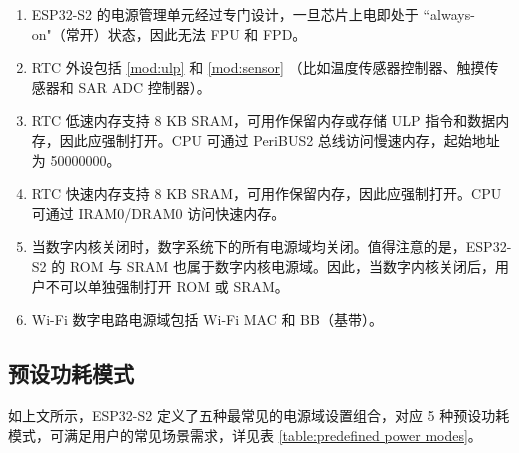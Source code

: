 \documentclass[main\_\_CN.tex]{subfiles}
\begin{document}
\begin{tiplisting}
\vspace{-2em}\label{RTC_STATUS}
\begin{enumerate}
\item ESP32-S2 的电源管理单元经过专门设计，一旦芯片上电即处于 ``always-on"（常开）状态，因此无法 FPU 和 FPD。
\item RTC 外设包括 \ref{mod:ulp} \textit{} 和 \ref{mod:sensor} \textit{}（比如温度传感器控制器、触摸传感器和 SAR ADC 控制器）。
\item RTC 低速内存支持 8 KB SRAM，可用作保留内存或存储 ULP 指令和数据内存，因此应强制打开。CPU 可通过 PeriBUS2 总线访问慢速内存，起始地址为 \hexprefix{}50000000。
\item RTC 快速内存支持 8 KB SRAM，可用作保留内存，因此应强制打开。CPU 可通过 IRAM0/DRAM0 访问快速内存。
\item 当数字内核关闭时，数字系统下的所有电源域均关闭。值得注意的是，ESP32-S2 的 ROM 与 SRAM 也属于数字内核电源域。因此，当数字内核关闭后，用户不可以单独强制打开 ROM 或 SRAM。
\item  Wi-Fi 数字电路电源域包括 Wi-Fi MAC 和 BB（基带）。
\end{enumerate}
\end{tiplisting}

\subsection{预设功耗模式}
如上文所示，ESP32-S2 定义了五种最常见的电源域设置组合，对应 5 种预设功耗模式，可满足用户的常见场景需求，详见表 \ref{table:predefined power modes}。
\end{document}
